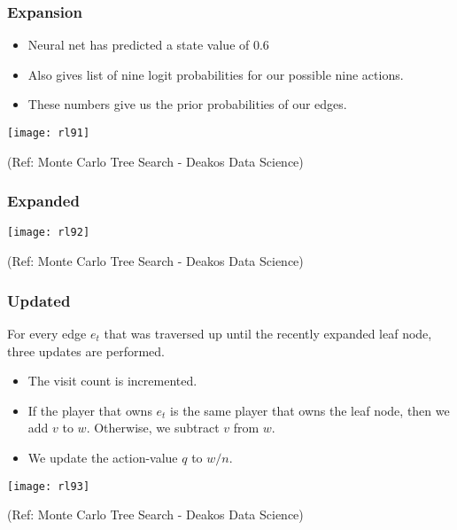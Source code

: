 \begin{frame}[fragile]\frametitle{Expansion}

\begin{itemize}
\item Neural net has predicted a state value of 0.6
\item Also gives list of nine logit probabilities for our possible nine actions. 
\item These numbers give us the prior probabilities of our edges.
\end{itemize}

\begin{center}
\texttt{[image: rl91]}
\end{center}

{\tiny (Ref: Monte Carlo Tree Search - Deakos Data Science)}

\end{frame}

\begin{frame}[fragile]\frametitle{Expanded}

\begin{center}
\texttt{[image: rl92]}
\end{center}

{\tiny (Ref: Monte Carlo Tree Search - Deakos Data Science)}

\end{frame}

\begin{frame}[fragile]\frametitle{Updated}

For every edge $e_t$ that was traversed up until the recently expanded leaf node, three updates are performed.

\begin{itemize}
\item The visit count is incremented.
\item If the player that owns $e_t$ is the same player that owns the leaf node, then we add $v$ to $w$. Otherwise, we subtract $v$ from $w$.
\item We update the action-value $q$ to $w/n$.
\end{itemize}

\begin{center}
\texttt{[image: rl93]}
\end{center}

{\tiny (Ref: Monte Carlo Tree Search - Deakos Data Science)}

\end{frame}

